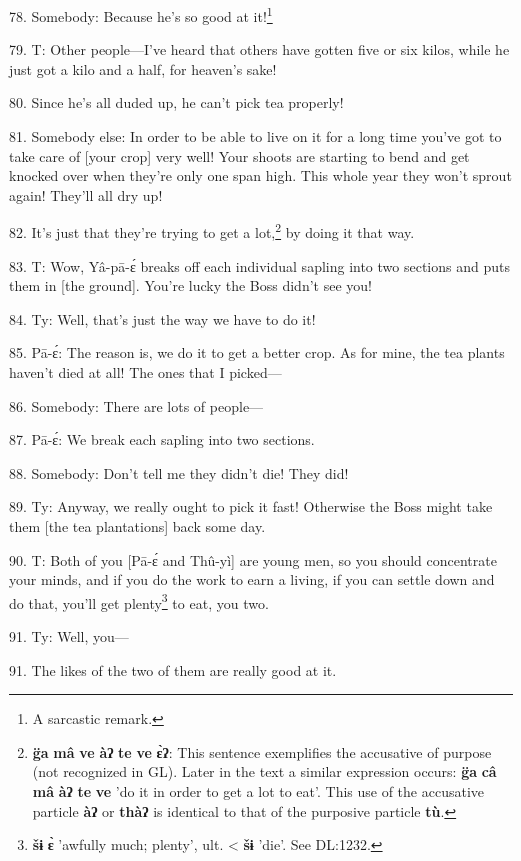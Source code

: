 78. Somebody: Because he's so good at it!\footnote{A sarcastic remark.}

79. T: Other people---I've heard that others have gotten five or six kilos, while
he just got a kilo and a half, for heaven's sake!

80. Since he's all duded up, he can't pick tea properly!

81. Somebody else: In order to be able to live on it for a long time you've got
to take care of [your crop] very well! Your shoots are starting to bend and get
knocked over when they're only one span high. This whole year they won't sprout
again! They'll all dry up!

82. It's just that they're trying to get a lot,\footnote{\textbf{g̈a} \textbf{mâ} \textbf{ve} \textbf{àʔ} \textbf{te} \textbf{ve} \textbf{ɛ̀ʔ}: This sentence exemplifies the accusative of purpose (not recognized in GL). Later in the text a similar expression occurs: \textbf{g̈a} \textbf{câ} \textbf{mâ} \textbf{àʔ} \textbf{te} \textbf{ve} 'do it in order to get a lot to eat'. This use of the accusative particle \textbf{àʔ} or \textbf{thàʔ} is identical to that of the purposive particle \textbf{tù}.} by doing it that way.

83. T: Wow, Yâ-pā-ɛ́\textit{ }breaks off each individual sapling into two
sections and puts them in [the ground]. You're lucky the Boss didn't see you!

84. Ty: Well, that's just the way we have to do it!

85. Pā-ɛ́: The reason is, we do it to get a better crop. As for mine, the tea
plants haven't died at all! The ones that I picked---

86. Somebody: There are lots of people---

87. Pā-ɛ́: We break each sapling into two sections.

88. Somebody: Don't tell me they didn't die! They did!

89. Ty: Anyway, we really ought to pick it fast! Otherwise the Boss might take
them [the tea plantations] back some day.

90. T: Both of you [Pā-ɛ́ and Thû-yì] are young men, so you should concentrate
your minds, and if you do the work to earn a living, if you can settle down and
do that, you'll get plenty\footnote{\textbf{šɨ} \textbf{ɛ̀} 'awfully much; plenty', ult. < \textbf{šɨ} 'die'. See DL:1232.} to eat, you two.

91. Ty: Well, you---

91. The likes of the two of them are really good at it.


